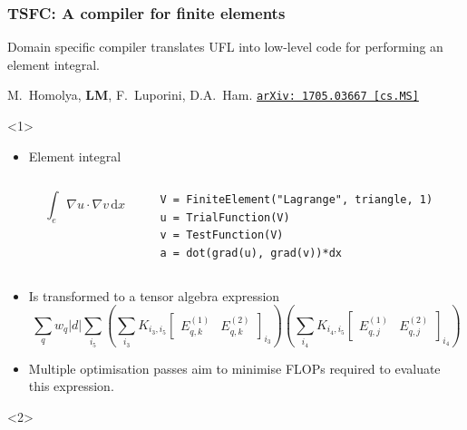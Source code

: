 \documentclass[presentation]{beamer}
\newcommand{\arxivlink}[2]{%
  \href{http://www.arxiv.org/abs/#1}%
  {\texttt{arXiv:\,#1\,[#2]}}%
}
\begin{document}
\begin{frame}[fragile]
  \frametitle{TSFC: A compiler for finite elements}
  Domain specific compiler translates UFL into
  low-level code for performing an element integral.
  \begin{flushright}
    {\scriptsize M.~Homolya, \textbf{LM}, F.~Luporini, D.A.~Ham. \arxivlink{1705.03667}{cs.MS}}
  \end{flushright}
  \begin{overlayarea}{\textwidth}{0.8\textheight}
  \begin{onlyenv}<1> 
    \begin{itemize}
    \item Element integral
      \begin{columns}
        \begin{column}{0.4\textwidth}
          \begin{equation*}
            \int_e \nabla u \cdot \nabla v\,\text{d}x
          \end{equation*}
        \end{column}
        \hspace{-3em}
        \begin{column}{0.6\textwidth}
\begin{verbatim}
V = FiniteElement("Lagrange", triangle, 1)
u = TrialFunction(V)
v = TestFunction(V)
a = dot(grad(u), grad(v))*dx
\end{verbatim}
        \end{column}
      \end{columns}
    \item Is transformed to a tensor algebra expression
      {\small \begin{equation*}
    \sum_q w_q \left| d \right| \sum_{i_5} \left( \sum_{i_3}
      K_{i_3,i_5} \begin{bmatrix}
        E^{(1)}_{q,k} & E^{(2)}_{q,k}
      \end{bmatrix}_{i_3} \right)
    \left( \sum_{i_4} K_{i_4,i_5} \begin{bmatrix}
        E^{(1)}_{q,j} & E^{(2)}_{q,j}
      \end{bmatrix}_{i_4} \right)
  \end{equation*}}
\item Multiple optimisation passes aim to minimise FLOPs required to
  evaluate this expression.
    \end{itemize}
  \end{onlyenv}
  \begin{onlyenv}<2>
    \begin{columns}

\end{columns}
\end{onlyenv}
\end{overlayarea}
\end{frame}
\end{document}
